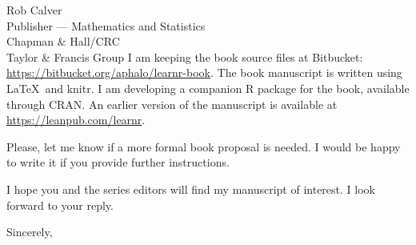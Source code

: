 \documentclass[a4paper]{scrlttr2}
\begin{document}
\begin{letter}{Rob Calver\\Publisher --- Mathematics and Statistics\\ Chapman \& Hall/CRC\\ Taylor \& Francis Group}
I am keeping the book source files at Bitbucket: \url{https://bitbucket.org/aphalo/learnr-book}. The book manuscript is written using \LaTeX\ and knitr. I am developing a companion R package for the book, available through CRAN. An earlier version of the manuscript is available at \url{https://leanpub.com/learnr}.

Please, let me know if a more formal book proposal is needed. I would be happy to write it if you provide further instructions.

I hope you and the series editors will find my manuscript of interest. I look forward to your reply.

\closing{Sincerely,}


\end{letter}
\end{document}
